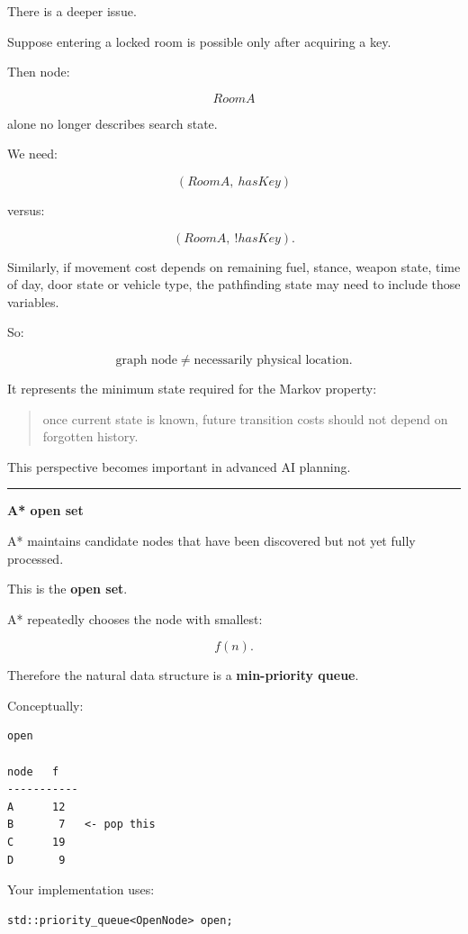 There is a deeper issue.

Suppose entering a locked room is possible only after acquiring a key.

Then node:

\[
RoomA
\]

alone no longer describes search state.

We need:

\[
(RoomA,\ hasKey)
\]

versus:

\[
(RoomA,\ !hasKey).
\]

Similarly, if movement cost depends on remaining fuel, stance, weapon state, time of day, door state or vehicle type, the pathfinding state may need to include those variables.

So:

\[
\boxed{
\text{graph node}
\neq
\text{necessarily physical location}.
}
\]

It represents the minimum state required for the Markov property:

\begin{quote}
once current state is known, future transition costs should not depend on forgotten history.
\end{quote}

This perspective becomes important in advanced AI planning.

\begin{center}\rule{0.5\linewidth}{0.5pt}\end{center}

\textbf{A* open set}

A* maintains candidate nodes that have been discovered but not yet fully processed.

This is the \textbf{open set}.

A* repeatedly chooses the node with smallest:

\[
f(n).
\]

Therefore the natural data structure is a \textbf{min-priority queue}.

Conceptually:

\begin{verbatim}
open

node   f
-----------
A      12
B       7   <- pop this
C      19
D       9
\end{verbatim}

Your implementation uses:

\begin{verbatim}
std::priority_queue<OpenNode> open;
\end{verbatim}

